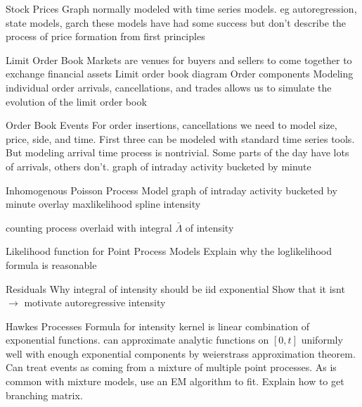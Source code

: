 \documentclass[usenames,dvipsnames,handout]{beamer}
\begin{document}
\frame{\titlepage}

\begin{frame}{Stock Prices}
	Graph
	normally modeled with time series models. eg autoregression, state models, garch
	these models have had some success but don't describe the process of price formation from first principles
\end{frame}

\begin{frame}{Limit Order Book}
	Markets are venues for buyers and sellers to come together to exchange financial assets
	Limit order book diagram
	Order components
	Modeling individual order arrivals, cancellations, and trades allows us to simulate the evolution of the limit order book
\end{frame}

\begin{frame}{Order Book Events}
	For order insertions, cancellations we need to model size, price, side, and time.
	First three can be modeled with standard time series tools. But modeling arrival time process is nontrivial. Some parts of the day have lots of arrivals, others don't.
	graph of intraday activity bucketed by minute
\end{frame}

\begin{frame}{Inhomogenous Poisson Process Model}
	graph of intraday activity bucketed by minute
	overlay maxlikelihood spline intensity

	counting process overlaid with integral $\bar{\Lambda}$ of intensity
\end{frame}

\begin{frame}{Likelihood function for Point Process Models}
	Explain why the loglikelihood formula is reasonable
\end{frame}

\begin{frame}{Residuals}
	Why integral of intensity should be iid exponential
	Show that it isnt $\to$ motivate autoregressive intensity
\end{frame}

\begin{frame}{Hawkes Processes}
	Formula for intensity
	kernel is linear combination of exponential functions. can approximate analytic functions on $[0,t]$ uniformly well with enough exponential components by weierstrass approximation theorem.
	Can treat events as coming from a mixture of multiple point processes. As is common with mixture models, use an EM algorithm to fit.
	Explain how to get branching matrix.
\end{frame}
\end{document}
